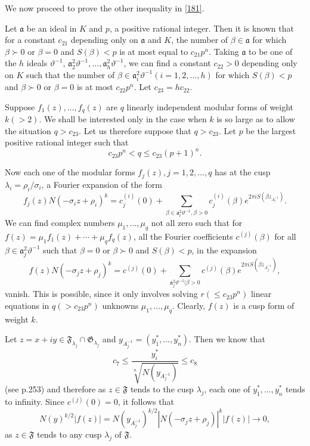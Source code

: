 We now proceed to prove the other inequality in \eqref{181}.

Let $\mathfrak{a}$ be an ideal in $K$ and $p$, a positive rational
integer. Then it is known that for a constant $c_{21}$ depending only
on $\mathfrak{a}$ and $K$, the number of $\beta\in\mathfrak{a}$ for
which $\beta \succ 0$ or $\beta=0$ and $S(\beta)<p$ is at most equal to
$c_{21}p^{n}$. Taking $\mathfrak{a}$ to be one of the $h$ ideals
$\vartheta^{-1}$,
$\mathfrak{a}^{2}_{2}\vartheta^{-1},\ldots,\mathfrak{a}^{2}_{h}\vartheta^{-1}$,
we can find a constant $c_{22}>0$ depending only on $K$ such that the
number of $\beta\in\mathfrak{a}^{2}_{i}\vartheta^{-1}(i=1,2,\ldots,h)$
for which $S(\beta)<p$ and $\beta \succ 0$ or $\beta=0$ is at most
$c_{22}p^{n}$. Let $c_{23}=hc_{22}$.

Suppose $f_{1}(z),\ldots,f_{q}(z)$ are $q$ linearly independent
modular forms of weight $k(>2)$. We shall be interested only in the
case when $k$ is so large as to allow the situation $q>c_{23}$. Let us
therefore suppose that $q>c_{23}$. Let $p$ be the largest positive
rational integer such that
$$
c_{23}p^{n}<q\leq c_{23}(p+1)^{n}.
$$

Now each one of the modular forms $f_{j}(z),j=1,2,\ldots,q$ has at the
cusp $\lambda_{i}=\rho_{i}/\sigma_{i}$, a Fourier expansion of the
form
$$
f_{j}(z)N(-\sigma_{i}z+\rho_{i})^{k}=c^{(i)}_{j}(0)+\sum_{\beta\in
  \mathfrak{a}^{2}_{i}\vartheta^{-1},\beta>0}c^{(i)}_{j}(\beta)e^{2\pi
  iS(\beta z_{A^{-1}_{i}})}.
$$
We can find complex numbers $\mu_{1},\ldots,\mu_{q}$ not all zero such
that for $f(z)=\mu_{1}f_{1}(z)+\cdots+\mu_{q}f_{q}(z)$,\pageoriginale
all the Fourier coefficients $c^{(j)}(\beta)$ for all $\beta\in
\mathfrak{a}^{2}_{j}\vartheta^{-1}$ such that $\beta=0$ or $\beta
\succ 0$ and $S(\beta)<p$, in the expansion
\begin{equation*}
f(z)N(-\sigma_{j}z+\rho_{j})^{k}=c^{(j)}(0)+\sum_{\mathfrak{a}^{2}_{j}\vartheta^{-1}|\beta>0}c^{(j)}(\beta)e^{2\pi
  iS(\beta z_{A^{-1}_{j}})},\tag{183}\label{183}
\end{equation*}
vanish. This is possible, since it only involves solving $r(\leq
c_{23}p^{n})$ linear equations in $q(>c_{23}p^{n})$ unknowns
$\mu_{1},\ldots,\mu_{q}$. Clearly, $f(z)$ is a cusp form of weight
$k$.

Let $z=x+iy\in\mathfrak{F}_{\lambda_{j}}\cap
\mathfrak{G}_{\lambda_{j}}$ and
$y_{A^{-1}_{j}}=(y^{\ast}_{1},\ldots,y^{\ast}_{n})$. Then we know that
$$
c_{7}\leq \frac{y^{\ast}_{i}}{\sqrt[n]{N(y_{A^{-1}_{j}})}}\leq c_{8}
$$
(see p.\@ 253) and therefore as $z\in\mathfrak{F}$ tends to the cusp
$\lambda_{j}$, each one of $y^{\ast}_{1},\ldots,y^{\ast}_{n}$ tends to
infinity. Since $c^{(j)}(0)=0$, it follows that
$$
N(y)^{k/2}|f(z)|=N(y_{A^{-1}_{j}})^{k/2}|N(-\sigma_{j}z+\rho_{j})|^{k}|f(z)|\to
0,
$$
as $z\in\mathfrak{F}$ tends to any cusp $\lambda_{j}$ of
$\mathfrak{F}$.

